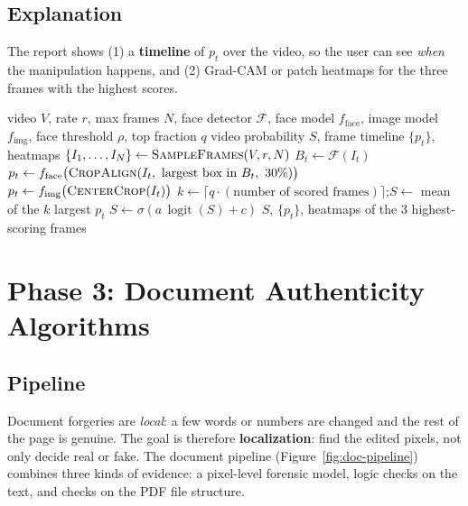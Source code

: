 \documentclass[11pt,a4paper]{article}
\begin{document}
\subsection{Explanation}
The report shows (1) a \textbf{timeline} of $p_t$ over the video, so the user can see
\emph{when} the manipulation happens, and (2) Grad-CAM or patch heatmaps for the three frames with
the highest scores.

\begin{algorithm}[htbp]
\caption{Video inference}
\label{alg:video}
\begin{algorithmic}[1]
\Require video $V$, rate $r$, max frames $N$, face detector $\mathcal{F}$, face model $f_{\text{face}}$,
         image model $f_{\text{img}}$, face threshold $\rho$, top fraction $q$
\Ensure video probability $S$, frame timeline $\{p_t\}$, heatmaps
\State $\{I_1,\dots,I_N\}\gets\textsc{SampleFrames}(V,r,N)$
  \State $B_t\gets\mathcal{F}(I_t)$ 
\EndFor
{} 
    \State $p_t\gets f_{\text{face}}\bigl(\textsc{CropAlign}(I_t,\ \text{largest box in }B_t,\ 30\%)\bigr)$
  \EndFor
\Else {}
    \State $p_t\gets f_{\text{img}}\bigl(\textsc{CenterCrop}(I_t)\bigr)$
  \EndFor
\EndIf
\State $k\gets\lceil q\cdot(\text{number of scored frames})\rceil$;\quad $S\gets$ mean of the $k$ largest $p_t$
\State $S\gets\sigma(a\,\operatorname{logit}(S)+c)$ 
\State \Return $S$, $\{p_t\}$, heatmaps of the 3 highest-scoring frames
\end{algorithmic}
\end{algorithm}

\section{Phase 3: Document Authenticity Algorithms}
\label{sec:document}

\subsection{Pipeline}
Document forgeries are \emph{local}: a few words or numbers are changed and the rest of the page is
genuine. The goal is therefore \textbf{localization}: find the edited pixels, not only decide
real or fake. The document pipeline (Figure~\ref{fig:doc-pipeline}) combines three kinds of
evidence: a pixel-level forensic model, logic checks on the text, and checks on the PDF file
structure.
\end{document}

